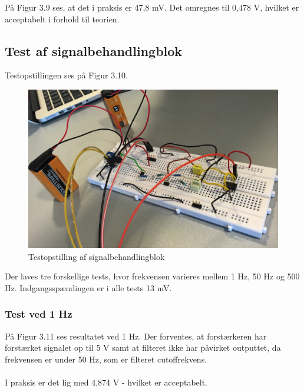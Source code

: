 På Figur 3.9 ses, at det i praksis er 47,8 mV. Det omregnes til 0,478 V, hvilket er acceptabelt i forhold til teorien. 

\subsection{Test af signalbehandlingblok}

Testopstillingen ses på Figur 3.10. 

\begin{figure}[H]
	\centering
	\includegraphics[width=1\textwidth]{Figurer/Snip20151202_26}
	\caption{Testopstilling af signalbehandlingblok}
	\label{fig:Signalbehanlding}
\end{figure}

Der laves tre forskellige tests, hvor frekvensen varieres mellem 1 Hz, 50 Hz og 500 Hz. Indgangsspændingen er i alle tests 13 mV. 
\\
\subsubsection{Test ved 1 Hz}
På Figur 3.11 ses resultatet ved 1 Hz. Der forventes, at forstærkeren har forstærket signalet op til 5 V samt at filteret ikke har påvirket outputtet, da frekvensen er under 50 Hz, som er filteret cutoffrekvens.
\\ \\
I praksis er det lig med 4,874 V - hvilket er acceptabelt.  
 
